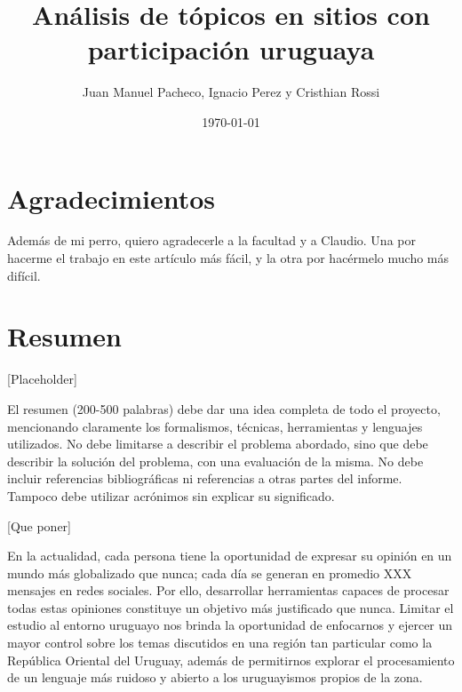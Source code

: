 \documentclass[oneside]{prgrado}
\title{Análisis de tópicos en sitios con participación uruguaya}
\author{Juan Manuel Pacheco, Ignacio Perez y Cristhian Rossi}
\date{\today}
\begin{document}

\frontmatter %

\maketitle



\chapter*{Agradecimientos}

Además de mi perro, quiero agradecerle a la facultad y a Claudio. Una por hacerme el trabajo en este artículo más fácil, y la otra por hacérmelo mucho más difícil. 



\chapter*{Resumen}

[Placeholder]

El resumen (200-500 palabras) debe dar una idea completa de todo el
proyecto, mencionando claramente los formalismos, técnicas, herramientas y lenguajes
utilizados. No debe limitarse a describir el problema abordado, sino que debe describir
la solución del problema, con una evaluación de la misma. No debe incluir referencias
bibliográficas ni referencias a otras partes del informe. Tampoco debe utilizar
acrónimos sin explicar su significado.

[Que poner]

En la actualidad, cada persona tiene la oportunidad de expresar su opinión en un mundo más globalizado que nunca; cada día se generan en promedio XXX mensajes en redes sociales. Por ello, desarrollar herramientas capaces de procesar todas estas opiniones constituye un objetivo más justificado que nunca. Limitar el estudio al entorno uruguayo nos brinda la oportunidad de enfocarnos y ejercer un mayor control sobre los temas discutidos en una región tan particular como la República Oriental del Uruguay, además de permitirnos explorar el procesamiento de un lenguaje más ruidoso y abierto a los uruguayismos propios de la zona.
\end{document}
